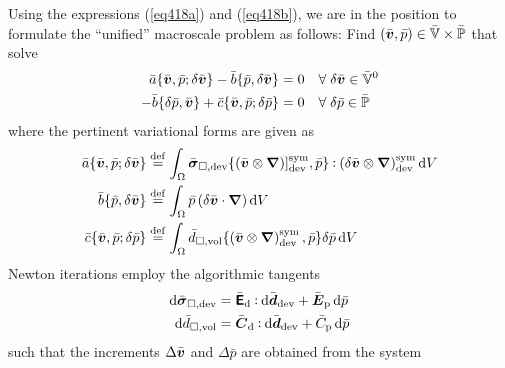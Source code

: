 \documentclass[10pt,a4paper]{article}
\newcommand{\ded}{\mathrm{d}}
\newcommand{\dep}{\mathrm{p}}
\begin{document}
Using the expressions (\ref{eq418a}) and (\ref{eq418b}), we are in the position to formulate the ``unified'' macroscale problem as follows: Find $(\bar{\boldsymbol{v}},\bar p) \in\bar{\mathbb{V}}\times\bar{\mathbb{P}}$ that solve
\begin{align}
 \bar a\{\bar{\boldsymbol{v}},\bar p; \delta\bar{\boldsymbol{v}}\} - \bar b\{\bar p, \delta\bar{\boldsymbol{v}}\} &= 0   \quad \forall\; \delta\bar{\boldsymbol{v}} \in \bar{\mathbb{V}}^0
 \label{eq411a}\\
 - \bar b\{\delta\bar p, \bar{\boldsymbol{v}}\} + \bar c\{\bar{\boldsymbol{v}}, \bar p; \delta\bar p\}&= 0   \quad \forall\; \delta\bar p \in \bar{\mathbb{P}}
 \label{eq411b}
\end{align}
where the pertinent variational forms are given as
\begin{align}
 \bar a\{\bar{\boldsymbol{v}},\bar p; \delta\bar{\boldsymbol{v}}\} &\overset{\mathrm{def}}{=} \int_\Omega \bar{\boldsymbol{\sigma}}_{\Box,\mathrm{dev}}\{\left(\bar{\boldsymbol{v}}\mathbin{\otimes} \boldsymbol{\nabla}\right)]^{\mathrm{sym}}_{\mathrm{dev}},\bar p\}\mathbin{\vcentcolon} \left(\delta\bar{\boldsymbol{v}}\mathbin{\otimes} \boldsymbol{\nabla}\right)^{\mathrm{sym}}_{\mathrm{dev}} \operatorname{d \!} V
 \label{eq412a}\\
 \bar b\{\bar p, \delta\bar{\boldsymbol{v}}\}             &\overset{\mathrm{def}}{=} \int_\Omega \bar p\left(\delta\bar{\boldsymbol{v}}\cdot\boldsymbol{\nabla}\right)\operatorname{d \!} V
 \label{eq412b}\\
 \bar c\{\bar{\boldsymbol{v}}, \bar p; \delta\bar p\}     &\overset{\mathrm{def}}{=} \int_\Omega \bar d_{\Box,\mathrm{vol}}\{\left(\bar{\boldsymbol{v}}\mathbin{\otimes} \boldsymbol{\nabla}\right)^{\mathrm{sym}}_{\mathrm{dev}},\bar p\}\delta\bar p\operatorname{d \!} V
 \label{eq412c}
\end{align}
Newton iterations employ the algorithmic tangents
\begin{align}
 \dif \bar{\ts\sigma}_{\Box,\dev} &= \bar{\tf E}_\ded \dprod \dif\bar{\ts d}_\dev + \bar{\ts E}_\dep \dif\bar{p}
 \label{eq413a} \\
 \dif \bar{d}_{\Box,\vol} &= \bar{\ts C}_\ded \dprod \dif \bar{\ts d}_\dev + \bar{C}_\dep \dif\bar{p}
 \label{eq413b}
\end{align}
such that the increments $\Delta\bar{\boldsymbol{v}}$ and $\Delta\bar{p}$ are obtained from the system
\end{document}
